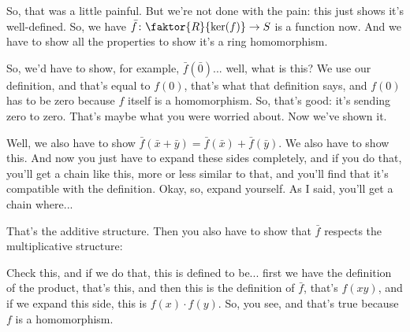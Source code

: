 \begin{proofWrapper}
\begin{speech}[00:58:44 - 01:00:17]
So, that was a little painful. But we're not done with the pain: this just shows it's well-defined. So, we have $\bar{f} \colon \faktor{R}{\ker(f)} \to S$ is a function now.  And we have to show all the properties to show it's a ring homomorphism. 

So, we'd have to show, for example, $\bar{f}(\bar{0})$... well, what is this? We use our definition, and that's equal to $f(0)$, that's what that definition says, and $f(0)$ has to be zero because $f$ itself is a homomorphism.  So, that's good: it's sending zero to zero. That's maybe what you were worried about. Now we've shown it. 

Well, we also have to show $\bar{f}(\bar{x} + \bar{y}) = \bar{f}(\bar{x}) + \bar{f}(\bar{y})$.  We also have to show this. And now you just have to expand these sides completely, and if you do that, you'll get a chain like this, more or less similar to that, and you'll find that it's compatible with the definition. Okay, so, expand yourself.  As I said, you'll get a chain where...
\end{speech}

\begin{speech}[01:00:17 - 01:01:57]
That's the additive structure. Then you also have to show that $\bar{f}$ respects the multiplicative structure:  

Check this, and if we do that, this is defined to be... first we have the definition of the product, that's this,  and then this is the definition of $\bar{f}$, that's $f(x y)$,  and if we expand this side, this is $f(x) \cdot f(y)$.  So, you see, and that's true because $f$ is a homomorphism.  


\end{speech}
\end{proofWrapper}
